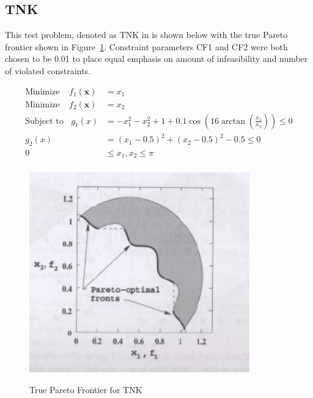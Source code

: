 \documentclass{article}
\begin{document}
\subsection{TNK} 
This test problem, denoted as TNK in \cite{deb2001multi} is shown below with the true Pareto frontier shown in Figure~\ref{fig:TNK_true}. Constraint parameters CF1 and CF2 were both chosen to be 0.01 to place equal emphasis on amount of infeasibility and number of violated constraints.

\begin{align*}
\textrm{Minimize} ~~~~~ f_1(\textbf{x}) &= x_1 \\
\textrm{Minimize} ~~~~~ f_2(\textbf{x}) &= x_2 \\
\textrm{Subject to} ~~~~ g_1(x) &= -x_1^2-x_2^2+1+0.1\cos(16\arctan(\frac{x_1}{x_2})) \leq 0 \\
g_2(x) &= (x_1 - 0.5)^2 + (x_2 - 0.5)^2 -0.5 \leq 0 \\
0 &\leq  x_1,x_2 \leq \pi \\
\end{align*}
\begin{figure}[H]
  \caption{True Pareto Frontier for TNK}
  \centering
  \includegraphics[width=0.85\textwidth]{TNK_pareto_true.png}  
  \label{fig:TNK_true}
\end{figure}
\end{document}
